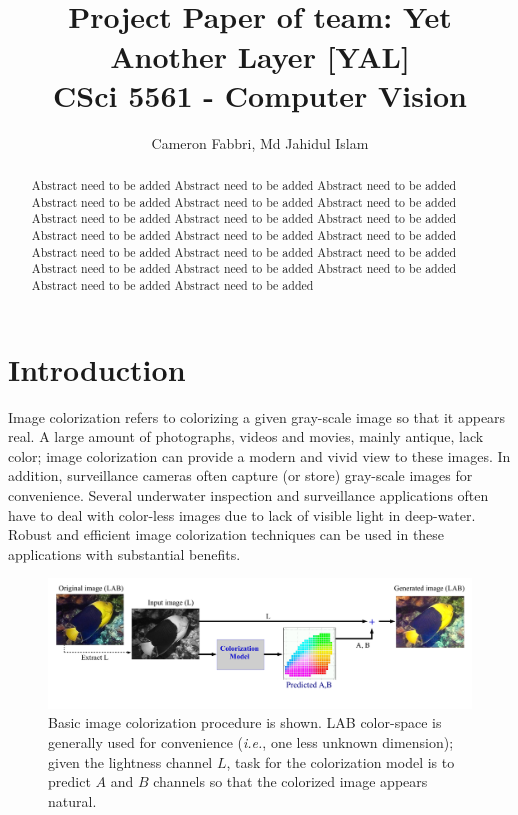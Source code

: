 \documentclass[10pt]{article}
\title{\textbf{\doctitle}\\ \vspace{3mm}
\small {Project Paper of team: Yet Another Layer [YAL]} \\
\small CSci 5561 - Computer Vision }
\author{Cameron Fabbri, Md Jahidul Islam}
\date{}
\begin{document}
\maketitle

\begin{abstract}
Abstract need to be added Abstract need to be added Abstract need to be added Abstract need to be added 
Abstract need to be added Abstract need to be added Abstract need to be added Abstract need to be added 
Abstract need to be added Abstract need to be added Abstract need to be added Abstract need to be added 
Abstract need to be added Abstract need to be added Abstract need to be added Abstract need to be added 
Abstract need to be added Abstract need to be added Abstract need to be added Abstract need to be added 
  
\end{abstract}

\section{Introduction}\label{sec:intro}
Image colorization \cite{zhang2016colorful, cheng2015deep, bugeau2014variational} refers to colorizing a given gray-scale image so that it appears real. 
A large amount of photographs, videos and movies, mainly antique, lack color; image colorization can provide a modern and vivid view to these images. In addition, surveillance cameras often capture (or store) gray-scale images for convenience. Several underwater inspection and surveillance applications \cite{lu2013underwater, torres2005color} often have to deal with color-less images due to lack of visible light in deep-water. Robust and efficient image colorization techniques can be used in these applications with substantial benefits.   

\begin{figure}[h]
\vspace{-3mm}
\centering
\includegraphics[width=\linewidth]{Figs/6.pdf}
\vspace{-13mm}
\caption{Basic image colorization procedure is shown. LAB color-space is generally used for convenience (\textit{i.e.}, one less unknown dimension); given the lightness channel $L$, task for the colorization model is to predict $A$ and $B$ channels so that the colorized image appears natural. }
\label{fig:col}
\end{figure}  
\end{document}
